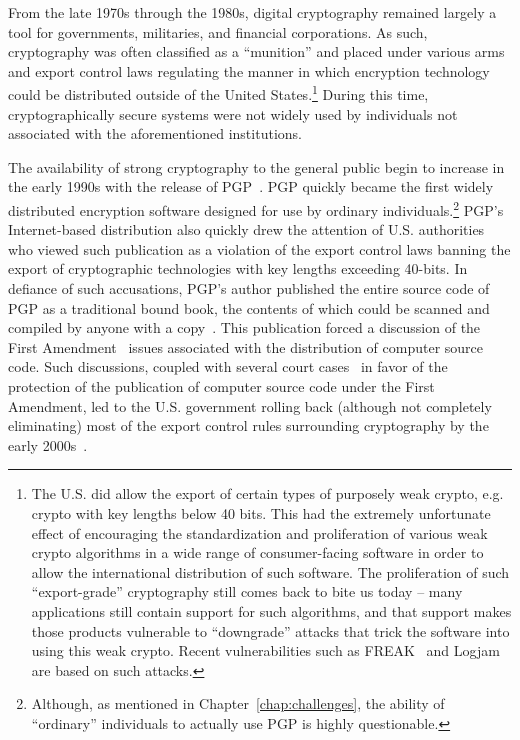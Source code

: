 From the late 1970s through the 1980s, digital cryptography remained
largely a tool for governments, militaries, and financial
corporations. As such, cryptography was often classified as a
``munition'' and placed under various arms and export control laws
regulating the manner in which encryption technology could be
distributed outside of the United States.\footnote{The U.S. did allow
  the export of certain types of purposely weak crypto, e.g. crypto
  with key lengths below 40 bits. This had the extremely unfortunate
  effect of encouraging the standardization and proliferation of
  various weak crypto algorithms in a wide range of consumer-facing
  software in order to allow the international distribution of such
  software. The proliferation of such ``export-grade'' cryptography
  still comes back to bite us today -- many applications still contain
  support for such algorithms, and that support makes those products
  vulnerable to ``downgrade'' attacks that trick the software into
  using this weak crypto. Recent vulnerabilities such as
  FREAK~\cite{beurdouche2015} and Logjam~\cite{adrian2015} are based
  on such attacks.} During this time, cryptographically secure systems
were not widely used by individuals not associated with the
aforementioned institutions.

The availability of strong cryptography to the general public begin to
increase in the early 1990s with the release of
PGP~\cite{zimmermann-pgp10}. PGP quickly became the first widely
distributed encryption software designed for use by ordinary
individuals.\footnote{Although, as mentioned in
  Chapter~\ref{chap:challenges}, the ability of ``ordinary''
  individuals to actually use PGP is highly
  questionable\cite{whitten1999}.}  PGP's Internet-based distribution
also quickly drew the attention of U.S. authorities who viewed such
publication as a violation of the export control laws banning the
export of cryptographic technologies with key lengths exceeding
40-bits. In defiance of such accusations, PGP's author published the
entire source code of PGP as a traditional bound book, the contents of
which could be scanned and compiled by anyone with a
copy~\cite{zimmermann-pgpsource}. This publication forced a discussion
of the First Amendment~\cite{us-constitution-amend1} issues associated
with the distribution of computer source code. Such discussions,
coupled with several court cases~\cite{ninthcir-bernstein,
  sixthcir-junger} in favor of the protection of the publication of
computer source code under the First Amendment, led to the U.S.
government rolling back (although not completely eliminating) most of
the export control rules surrounding cryptography by the early
2000s~\cite{kehl2015}.

